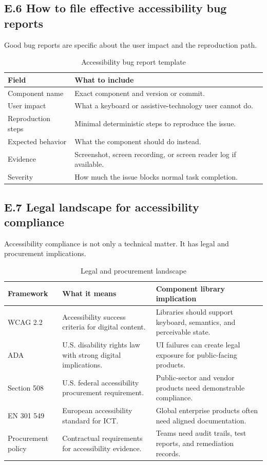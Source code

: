 \subsection*{E.6 How to file effective accessibility bug reports}
Good bug reports are specific about the user impact and the reproduction path.

\begin{table}[htbp]
  \centering
  \caption{Accessibility bug report template}
  \begin{tabularx}{\textwidth}{@{}p{}Y@{}}
    \toprule
    \textbf{Field} & \textbf{What to include} \\
    \midrule
    Component name & Exact component and version or commit. \\
    User impact & What a keyboard or assistive-technology user cannot do. \\
    Reproduction steps & Minimal deterministic steps to reproduce the issue. \\
    Expected behavior & What the component should do instead. \\
    Evidence & Screenshot, screen recording, or screen reader log if available. \\
    Severity & How much the issue blocks normal task completion. \\
    \bottomrule
  \end{tabularx}
\end{table}

\subsection*{E.7 Legal landscape for accessibility compliance}
Accessibility compliance is not only a technical matter. It has legal and procurement implications.

\begin{table}[htbp]
  \centering
  \caption{Legal and procurement landscape}
  \begin{tabularx}{\textwidth}{@{}p{}p{}Y@{}}
    \toprule
    \textbf{Framework} & \textbf{What it means} & \textbf{Component library implication} \\
    \midrule
    WCAG 2.2 & Accessibility success criteria for digital content. & Libraries should support keyboard, semantics, and perceivable state. \\
    ADA & U.S. disability rights law with strong digital implications. & UI failures can create legal exposure for public-facing products. \\
    Section 508 & U.S. federal accessibility procurement requirement. & Public-sector and vendor products need demonstrable compliance. \\
    EN 301 549 & European accessibility standard for ICT. & Global enterprise products often need aligned documentation. \\
    Procurement policy & Contractual requirements for accessibility evidence. & Teams need audit trails, test reports, and remediation records. \\
    \bottomrule
  \end{tabularx}
\end{table}

